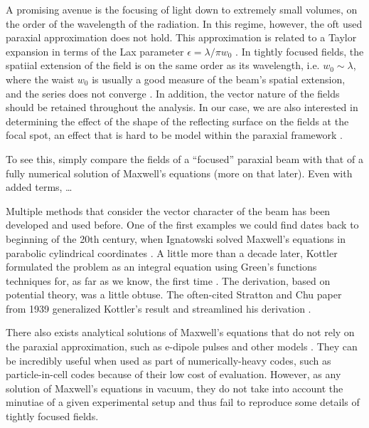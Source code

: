 \documentclass[11pt,SymmetricalJury]{inrsthesis/inrsthesis}
\begin{document}

A promising avenue is the focusing of light down to extremely small volumes, on the order
of the wavelength of the radiation. In this regime, however, the oft used paraxial approximation
does not hold. This approximation is related to a Taylor expansion in terms
of the Lax parameter $\epsilon=\lambda/\pi w_0$ \cite{Lax1975}. In tightly focused
fields, the spatiial extension of the field is on the same order as its wavelength,
i.e. $w_0\sim\lambda$, where the waist $w_0$ is usually a good measure of the beam's
spatial extension, and the series does not converge \cite{Borghi2003}. In addition,
the vector nature of the fields should be retained throughout the analysis.
In our case, we are also interested in determining the effect of the shape of
the reflecting surface on the fields at the focal spot, an effect that is hard to
be model within the paraxial framework \cite{Tkaczyk2012}.

To see this, simply compare the fields of a ``focused'' paraxial beam with that
of a fully numerical solution of Maxwell's equations (more on that later).
Even with added terms, \ldots{}


Multiple methods that consider the vector character of the beam has been
developed and used before. One of the first examples we could find
dates back to beginning of the 20th century, when Ignatowski solved Maxwell's
equations in parabolic cylindrical coordinates \cite{Ignatowsky1907,Ignatowsky1908}.
A little more than a decade later, Kottler formulated the problem as an
integral equation using Green's functions techniques for, as far as we know,
the first time \cite{Kottler1923a,Kottler1923b}.
The derivation, based on potential theory, was a little obtuse.
The often-cited Stratton and Chu paper from 1939 generalized Kottler's result
and streamlined his derivation \cite{Stratton1939}.

There also exists analytical solutions of Maxwell's equations that do not rely
on the paraxial approximation, such as e-dipole pulses and other models
\cite{Gonoskov2012,Salamin2015a,Salamin2015b}. They can be incredibly useful when used as part of
numerically-heavy codes, such as particle-in-cell codes because of their low
cost of evaluation. However, as any solution of Maxwell's equations in vacuum,
they do not take into account the minutiae of a given experimental setup
and thus fail to reproduce some details of tightly focused fields.
\end{document}
